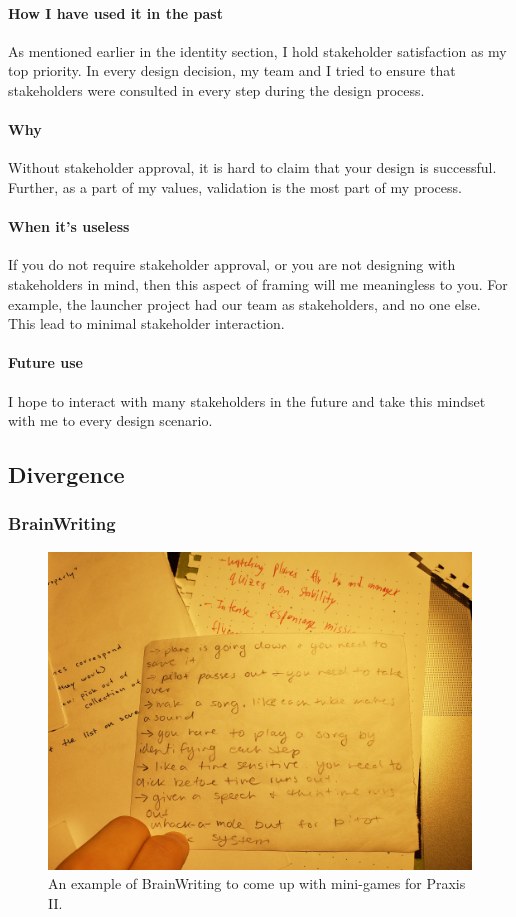 \documentclass[paper=a4, fontsize=11pt]{article} %
\newcommand{\raisetarget}[2]%
{\bgroup
  \sbox0{#2}%
  \raisebox{\ht0}{\hypertarget{#1}{}}\usebox0%
\egroup}
\begin{document}
            \paragraph{How I have used it in the past} As mentioned earlier in the identity section, I hold stakeholder satisfaction as my top priority. In every design decision, my team and I tried to ensure that stakeholders were consulted in every step during the design process.
            \paragraph{Why} Without stakeholder approval, it is hard to claim that your design is successful. Further, as a part of my values, validation \cite{validation} is the most part of my process. 
            \paragraph{When it's useless} If you do not require stakeholder approval, or you are not designing with stakeholders in mind, then this aspect of framing will me meaningless to you. For example, the launcher project had our team as stakeholders, and no one else. This lead to minimal stakeholder interaction. 
            \paragraph{Future use} I hope to interact with many stakeholders in the future and take this mindset with me to every design scenario. 
    \subsection{Divergence}
        \raisetarget{bwlink}{}
        \subsubsection{BrainWriting}
            \begin{figure}[H]
                \centering
	            \includegraphics[width=0.8\linewidth]{brain1.jpg}
	            \caption{An example of BrainWriting to come up with mini-games for Praxis II.}
            \end{figure}
\end{document}
